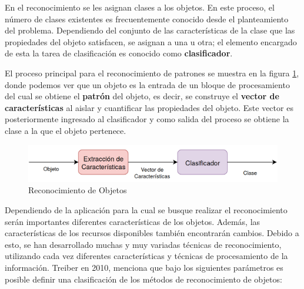 En el reconocimiento se les asignan clases a los objetos. En este proceso, el número de clases existentes es frecuentemente conocido desde el planteamiento del problema. Dependiendo del conjunto de las características de la clase que las propiedades del objeto satisfacen, se asignan a una u otra; el elemento encargado de esta la tarea de clasificación es conocido como \textbf{clasificador}.

El proceso principal para el reconocimiento de patrones se muestra en la figura \ref{fig:Pat_Recog}, donde podemos ver que un objeto es la entrada de un bloque de procesamiento del cual se obtiene el \textbf{patrón} del objeto, es decir, se construye el \textbf{vector de características} al aislar y cuantificar las propiedades del objeto. Este vector es posteriormente ingresado al clasificador y como salida del proceso se obtiene la clase a la que el objeto pertenece.

\begin{figure}[H]
\centering
\includegraphics[scale=0.3]{Figures/Clasificacion.png}
    \caption{Reconocimiento de Objetos}
    \label{fig:Pat_Recog}
\end{figure}

Dependiendo de la aplicación para la cual se busque realizar el reconocimiento serán importantes diferentes características de los objetos. Además, las características de los recursos disponibles también encontrarán cambios. Debido a esto, se han desarrollado muchas y muy variadas técnicas de reconocimiento, utilizando cada vez diferentes características y técnicas de procesamiento de la información.
Treiber \cite{treiber_introduction_2010} en 2010, menciona que bajo los siguientes parámetros es posible definir una clasificación de los métodos de reconocimiento de objetos:

